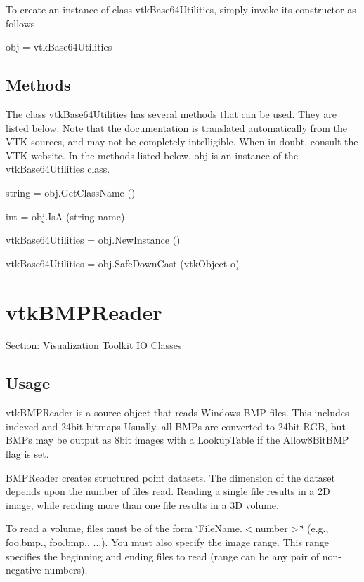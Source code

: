 To create an instance of class vtk\-Base64\-Utilities, simply invoke its constructor as follows \begin{DoxyVerb}  obj = vtkBase64Utilities
\end{DoxyVerb}
 \hypertarget{vtkwidgets_vtkxyplotwidget_Methods}{}\subsection{Methods}\label{vtkwidgets_vtkxyplotwidget_Methods}
The class vtk\-Base64\-Utilities has several methods that can be used. They are listed below. Note that the documentation is translated automatically from the V\-T\-K sources, and may not be completely intelligible. When in doubt, consult the V\-T\-K website. In the methods listed below, {\ttfamily obj} is an instance of the vtk\-Base64\-Utilities class. 
\begin{DoxyItemize}
\item {\ttfamily string = obj.\-Get\-Class\-Name ()}  
\item {\ttfamily int = obj.\-Is\-A (string name)}  
\item {\ttfamily vtk\-Base64\-Utilities = obj.\-New\-Instance ()}  
\item {\ttfamily vtk\-Base64\-Utilities = obj.\-Safe\-Down\-Cast (vtk\-Object o)}  
\end{DoxyItemize}\hypertarget{vtkio_vtkbmpreader}{}\section{vtk\-B\-M\-P\-Reader}\label{vtkio_vtkbmpreader}
Section\-: \hyperlink{sec_vtkio}{Visualization Toolkit I\-O Classes} \hypertarget{vtkwidgets_vtkxyplotwidget_Usage}{}\subsection{Usage}\label{vtkwidgets_vtkxyplotwidget_Usage}
vtk\-B\-M\-P\-Reader is a source object that reads Windows B\-M\-P files. This includes indexed and 24bit bitmaps Usually, all B\-M\-Ps are converted to 24bit R\-G\-B, but B\-M\-Ps may be output as 8bit images with a Lookup\-Table if the Allow8\-Bit\-B\-M\-P flag is set.

B\-M\-P\-Reader creates structured point datasets. The dimension of the dataset depends upon the number of files read. Reading a single file results in a 2\-D image, while reading more than one file results in a 3\-D volume.

To read a volume, files must be of the form \char`\"{}\-File\-Name.$<$number$>$\char`\"{} (e.\-g., foo.\-bmp., foo.\-bmp., ...). You must also specify the image range. This range specifies the beginning and ending files to read (range can be any pair of non-\/negative numbers).

